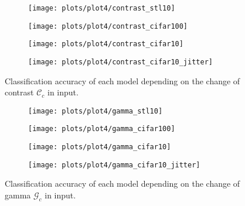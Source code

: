     \begin{figure}[h!]
    \begin{adjustwidth}{-11em}{-11em}
        \centering
        \begin{subfigure}{0.6\textwidth}
            \texttt{[image: plots/plot4/contrast\_stl10]}
        \end{subfigure}
        \begin{subfigure}{0.6\textwidth}
            \texttt{[image: plots/plot4/contrast\_cifar100]}
        \end{subfigure}
        \begin{subfigure}{0.6\textwidth}
            \texttt{[image: plots/plot4/contrast\_cifar10]}
        \end{subfigure}
        \begin{subfigure}{0.6\textwidth}
            \texttt{[image: plots/plot4/contrast\_cifar10\_jitter]}
        \end{subfigure}
    \end{adjustwidth}
        \caption{Classification accuracy of each model depending on the change
        of contrast $\mathcal{C}_c$ in input.}
        \label{fig:plot4contrast}
    \end{figure}


    \begin{figure}[h!]
    \begin{adjustwidth}{-11em}{-11em}
        \centering
        \begin{subfigure}{0.6\textwidth}
            \texttt{[image: plots/plot4/gamma\_stl10]}
        \end{subfigure}
        \begin{subfigure}{0.6\textwidth}
            \texttt{[image: plots/plot4/gamma\_cifar100]}
        \end{subfigure}
        \begin{subfigure}{0.6\textwidth}
            \texttt{[image: plots/plot4/gamma\_cifar10]}
        \end{subfigure}
        \begin{subfigure}{0.6\textwidth}
            \texttt{[image: plots/plot4/gamma\_cifar10\_jitter]}
        \end{subfigure}
    \end{adjustwidth}
        \caption{Classification accuracy of each model depending on the change
        of gamma $\mathcal{G}_c$ in input.}
        \label{fig:plot4gamma}
    \end{figure}


